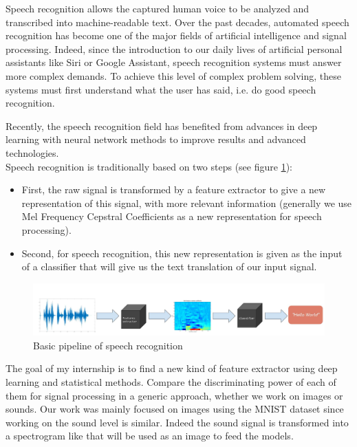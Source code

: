 Speech recognition allows the captured human voice to be analyzed and transcribed into machine-readable text. Over the past decades, automated speech recognition has become one of the major fields of artificial intelligence and signal processing. Indeed, since the introduction to our daily lives of artificial personal assistants like Siri or Google Assistant, speech recognition systems must answer more complex demands. To achieve this level of complex problem solving, these systems must first understand what the user has said, i.e. do good speech recognition. \newline

Recently, the speech recognition field has benefited from advances in deep learning with neural network methods to improve results and advanced technologies.\\
Speech recognition is traditionally based on two steps (see figure \ref{fig: Speech Procesing expain}):\\
\begin{itemize}
 \item 
First, the raw signal is transformed by a feature extractor to give a new representation of this signal, with more relevant information (generally we use Mel Frequency Cepstral Coefficients as a new representation for speech processing).
\item 
 Second, for speech recognition, this new representation is given as the input of a classifier that will give us the text translation of our input signal.

\end{itemize}
\begin{figure}[h]
 \hspace{-1cm}
 \includegraphics[scale=0.27]{Speech_Processing.jpg}
 \caption{Basic pipeline of speech recognition}
 \label{fig: Speech Procesing expain}
\end{figure}
The goal of my internship is to find a new kind of feature extractor using deep learning and statistical methods. Compare the discriminating power of each of them for signal processing in a generic approach, whether we work on images or sounds. Our work was mainly focused on images using the MNIST dataset since working on the sound level is similar. Indeed the sound signal is transformed into a spectrogram like that will be used as an image to feed the models.

